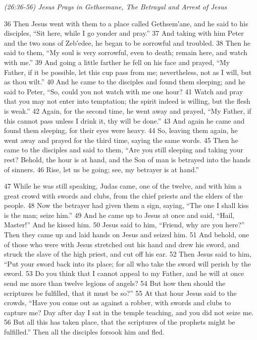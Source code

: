 \documentclass[letterpaper]{report}
\begin{document}
{\centering
	\emph{(26:36-56) Jesus Prays in Gethsemane, The Betrayal and Arrest of Jesus}\\
}
\begin{multicols}{2}
36 Then Jesus went with them to a place called Gethsem′ane, and he said to his disciples, “Sit here, while I go yonder and pray.” 37 And taking with him Peter and the two sons of Zeb′edee, he began to be sorrowful and troubled. 38 Then he said to them, “My soul is very sorrowful, even to death; remain here, and watch with me.” 39 And going a little farther he fell on his face and prayed, “My Father, if it be possible, let this cup pass from me; nevertheless, not as I will, but as thou wilt.” 40 And he came to the disciples and found them sleeping; and he said to Peter, “So, could you not watch with me one hour? 41 Watch and pray that you may not enter into temptation; the spirit indeed is willing, but the flesh is weak.” 42 Again, for the second time, he went away and prayed, “My Father, if this cannot pass unless I drink it, thy will be done.” 43 And again he came and found them sleeping, for their eyes were heavy. 44 So, leaving them again, he went away and prayed for the third time, saying the same words. 45 Then he came to the disciples and said to them, “Are you still sleeping and taking your rest? Behold, the hour is at hand, and the Son of man is betrayed into the hands of sinners. 46 Rise, let us be going; see, my betrayer is at hand.”

47 While he was still speaking, Judas came, one of the twelve, and with him a great crowd with swords and clubs, from the chief priests and the elders of the people. 48 Now the betrayer had given them a sign, saying, “The one I shall kiss is the man; seize him.” 49 And he came up to Jesus at once and said, “Hail, Master!” And he kissed him. 50 Jesus said to him, “Friend, why are you here?” Then they came up and laid hands on Jesus and seized him. 51 And behold, one of those who were with Jesus stretched out his hand and drew his sword, and struck the slave of the high priest, and cut off his ear. 52 Then Jesus said to him, “Put your sword back into its place; for all who take the sword will perish by the sword. 53 Do you think that I cannot appeal to my Father, and he will at once send me more than twelve legions of angels? 54 But how then should the scriptures be fulfilled, that it must be so?” 55 At that hour Jesus said to the crowds, “Have you come out as against a robber, with swords and clubs to capture me? Day after day I sat in the temple teaching, and you did not seize me. 56 But all this has taken place, that the scriptures of the prophets might be fulfilled.” Then all the disciples forsook him and fled.
\end{multicols}
\end{document}
